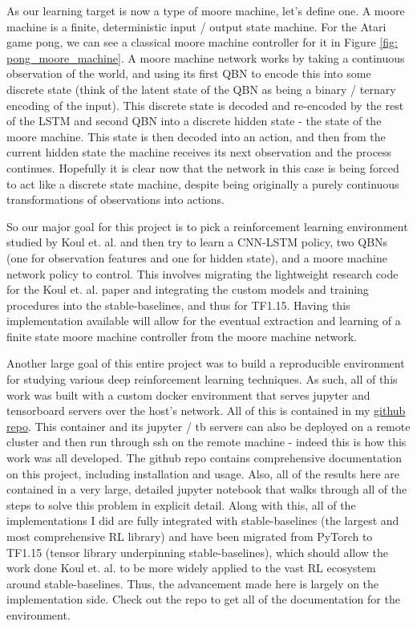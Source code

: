 As our learning target is now a type of moore machine, let's define one. A moore machine is a finite, deterministic input / output state machine. For the Atari game pong, we can see a classical moore machine controller for it in Figure \ref{fig: pong_moore_machine}. A moore machine network works by taking a continuous observation of the world, and using its first QBN to encode this into some discrete state (think of the latent state of the QBN as being a binary / ternary encoding of the input). This discrete state is decoded and re-encoded by the rest of the LSTM and second QBN into a discrete hidden state - the state of the moore machine. This state is then decoded into an action, and then from the current hidden state the machine receives its next observation and the process continues. Hopefully it is clear now that the network in this case is being forced to act like a discrete state machine, despite being originally a purely continuous transformations of observations into actions.

So our major goal for this project is to pick a reinforcement learning environment studied by Koul et. al. and then try to learn a CNN-LSTM policy, two QBNs (one for observation features and one for hidden state), and a moore machine network policy to control. This involves migrating the lightweight research code for the Koul et. al. paper and integrating the custom models and training procedures into the stable-baselines, and thus for TF1.15. Having this implementation available will allow for the eventual extraction and learning of a finite state moore machine controller from the moore machine network.

Another large goal of this entire project was to build a reproducible environment for studying various deep reinforcement learning techniques. As such, all of this work was built with a custom docker environment that serves jupyter and tensorboard servers over the host's network. All of this is contained in my \href{https://github.com/nicholasRenninger/NeuralMooreMachine_Experiments}{github repo}. This container and its jupyter / tb servers can also be deployed on a remote cluster and then run through ssh on the remote machine - indeed this is how this work was all developed. The github repo contains comprehensive documentation on this project, including installation and usage. Also, all of the results here are contained in a very large, detailed jupyter notebook that walks through all of the steps to solve this problem in explicit detail. Along with this, all of the implementations I did are fully integrated with stable-baselines (the largest and most comprehensive RL library) and have been migrated from PyTorch to TF1.15 (tensor library underpinning stable-baselines), which should allow the work done Koul et. al. to be more widely applied to the vast RL ecosystem around stable-baselines. Thus, the advancement made here is largely on the implementation side. Check out the repo to get all of the documentation for the environment.